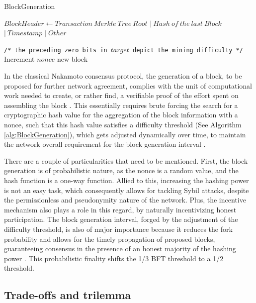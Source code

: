 \documentclass[journal]{IEEEtran}
\newcommand{\LineComment}[1]{\State \texttt{/* #1 */}}
\begin{document}
\begin{algorithm}
  \caption[short]{BlockGeneration}\label{alg:BlockGeneration}
  \begin{algorithmic}[1]
    \Function {}{}
      \State $Block Header \gets Transaction \ Merkle \ Tree \ Root$
      \Indent
        \State $| \ Hash \ of \ the \ last \ Block$
        \State $| \ Timestamp$
        \State $| \ Other$
      \EndIndent
      
      \LineComment{the preceding zero bits in $target$ depict the mining difficulty}
      \State Increment $nonce$
      \EndWhile
      \State \Return new block
    \EndFunction
  \end{algorithmic}
  \end{algorithm}
  
In the classical Nakamoto consensus protocol, the generation of a block, to be proposed
for further network agreement, complies with the unit of computational work needed to
create, or rather find, a verifiable proof of the effort spent on assembling the block \cite{nakamoto2008bitcoin}. 
This essentially requires brute forcing the search for a cryptographic hash value for the
aggregation of the block information with a nonce, such that this hash value satisfies
a difficulty threshold (See Algorithm \ref{alg:BlockGeneration}), which gets adjusted dynamically over time, to maintain the network overall 
requirement for the block generation interval \cite{8629877, survey-dist-consensus}.

There are a couple of particularities that need to be mentioned. First, the block generation
is of probabilistic nature, as the nonce is a random value, and the hash function is a one-way function.
Allied to this, increasing the hashing power is not an easy task, which consequently allows for tackling Sybil attacks,
despite the permissionless and pseudonymity nature of the network. Plus, the incentive mechanism
also plays a role in this regard, by naturally incentivizing honest participation.
The block generation interval, forged by the adjustment of the difficulty
threshold, is also of major importance because it reduces the fork probability and
allows for the timely propagation of proposed blocks, guaranteeing consensus
in the presence of an honest majority of the hashing power \cite{garay2015bitcoin, natoli2019deconstructing}.
This probabilistic finality shifts the 1/3 BFT threshold to a 1/2 threshold.

\subsection{Trade-offs and trilemma}
\end{document}
